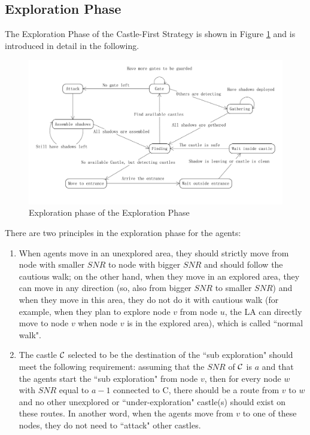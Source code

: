 \subsection{ Exploration Phase}
The Exploration Phase of the Castle-First Strategy is shown in Figure \ref{fig:castlestates} 
and is introduced in detail in the following.
\begin{figure}[H]
  \centering  
  \includegraphics[width=6.0in]{figures/castlestates.png}
  \caption{Exploration phase of the Exploration Phase}\label{fig:castlestates}
\end{figure} 
 
There are two principles in the exploration phase for the agents:
\begin{enumerate}
\item When agents move in an unexplored area, they should strictly move from node with smaller $SNR$ to node with bigger $SNR$ and should follow the cautious walk; on the other hand,  when they move in an explored area, they can move in  any direction   (so, also from bigger $SNR$ to smaller $SNR$) and when they  move in this area, they  do not do it with cautious walk  (for example, when they plan to explore node $v$ from node $u$, the LA can directly move to node $v$ when node $v$ is in the explored area), which is called ``normal walk".
\item The castle ${\cal C}$ selected to be the destination of the ``sub exploration" should meet  the following requirement: assuming that the $SNR$ of ${\cal C}$ is $a$ and 
that the agents start the  ``sub exploration" from node  $v$, 
 then for every node $w$ with $SNR$ equal to $a-1$ connected to {\cal C}, there should be a route from   $v$ to $w$    and no other unexplored or ``under-exploration" castle(s)  should exist on these routes. In another word, when the agents move from $v$ to one of these nodes,   they do not  need to ``attack" other castles. 
\end{enumerate}  

